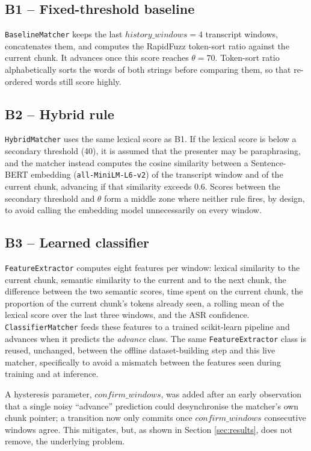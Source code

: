 \documentclass[conference,a4paper]{IEEEtran}
\begin{document}
\subsection{B1 -- Fixed-threshold baseline}
\texttt{BaselineMatcher} keeps the last \(history\_windows=4\) transcript windows, concatenates them, and computes the RapidFuzz token-sort ratio \cite{b5} against the current chunk. It advances once this score reaches \(\theta=70\). Token-sort ratio alphabetically sorts the words of both strings before comparing them, so that re-ordered words still score highly.

\subsection{B2 -- Hybrid rule}
\texttt{HybridMatcher} uses the same lexical score as B1. If the lexical score is below a secondary threshold (40), it is assumed that the presenter may be paraphrasing, and the matcher instead computes the cosine similarity between a Sentence-BERT embedding (\texttt{all-MiniLM-L6-v2}) of the transcript window and of the current chunk, advancing if that similarity exceeds 0.6. Scores between the secondary threshold and \(\theta\) form a middle zone where neither rule fires, by design, to avoid calling the embedding model unnecessarily on every window.

\subsection{B3 -- Learned classifier}
\texttt{FeatureExtractor} computes eight features per window: lexical similarity to the current chunk, semantic similarity to the current and to the next chunk, the difference between the two semantic scores, time spent on the current chunk, the proportion of the current chunk's tokens already seen, a rolling mean of the lexical score over the last three windows, and the ASR confidence. \texttt{ClassifierMatcher} feeds these features to a trained scikit-learn \cite{b4} pipeline and advances when it predicts the \emph{advance} class. The same \texttt{FeatureExtractor} class is reused, unchanged, between the offline dataset-building step and this live matcher, specifically to avoid a mismatch between the features seen during training and at inference.

A hysteresis parameter, \(confirm\_windows\), was added after an early observation that a single noisy ``advance'' prediction could desynchronise the matcher's own chunk pointer; a transition now only commits once \(confirm\_windows\) consecutive windows agree. This mitigates, but, as shown in Section \ref{sec:results}, does not remove, the underlying problem.
\end{document}
